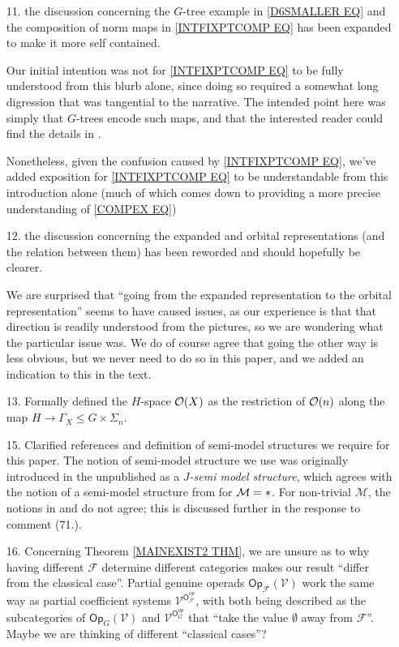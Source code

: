 \documentclass{article}
\begin{document}
\begin{itemize}
	\item[11.] the discussion concerning 
	the $G$-tree example in
	\eqref{D6SMALLER EQ}
	and 
	the composition of norm maps in
	\eqref{INTFIXPTCOMP EQ}
	has been expanded to make it more self contained.
	
	Our initial intention was not for
	\eqref{INTFIXPTCOMP EQ}
	to be fully understood from this blurb alone,
	since doing so required a somewhat long digression 
	that was tangential to the narrative.
	The intended point here
	was simply that $G$-trees encode such maps,
	and that the interested reader could find the details in \cite[\S 4]{Pe17}.
	
	Nonetheless, given the confusion caused by
	\eqref{INTFIXPTCOMP EQ},
	we've added exposition 
	for \eqref{INTFIXPTCOMP EQ} to be understandable from this introduction alone
	(much of which comes down
	to providing a more precise understanding of
	\eqref{COMPEX EQ})
	
	
	\item[12.] 
	the discussion concerning the expanded and orbital representations (and the relation between them) has been reworded and should hopefully be clearer.
	
	We are surprised that
	``going from the expanded representation to the orbital representation''
	seems to have caused issues, 
	as our experience is that that direction is 
	readily understood from the pictures,
	so we are wondering what the particular issue was.
	We do of course agree that going the other way is less obvious,
	but we never need to do so in this paper,
	and we added an indication to this in the text.
	


  \item[13.] Formally defined the $H$-space $\mathcal{O}(X)$ as the restriction of $\mathcal{O}(n)$ along the map $H \to \Gamma_X \leq G \times \Sigma_n$.
        
	\item[15.] Clarified references and definition of semi-model structures we require for this paper.
	The notion of semi-model structure we use was originally introduced in the unpublished \cite{Spi01} as a \textit{$J$-semi model structure},
	which agrees with the notion of a semi-model structure from \cite{WY18} for $\mathcal M = \**$.
	For non-trivial $\mathcal M$, the notions in \cite{Spi01} and \cite{WY18} do not agree;
	this is discussed further in the response to comment (71.).
	
	\item[16.] Concerning Theorem \ref{MAINEXIST2 THM},
	we are unsure as to why 
	having different $\mathcal{F}$ determine
	different categories makes our result
	``differ from the classical case''. 
	Partial genuine operads $\mathsf{Op}_{\mathcal{F}}(\mathcal{V})$
	work the same way as partial coefficient
	systems $\mathcal{V}^{\mathsf{O}_{\mathcal{F}}^{op}}$,
	with both being described as the subcategories
	of $\mathsf{Op}_{G}(\mathcal{V})$ and
	$\mathcal{V}^{\mathsf{O}_{G}^{op}}$
	that ``take the value $\emptyset$ away from $\mathcal{F}$''.
	Maybe we are thinking of different ``classical cases''? 
	

\end{itemize}
\end{document}
